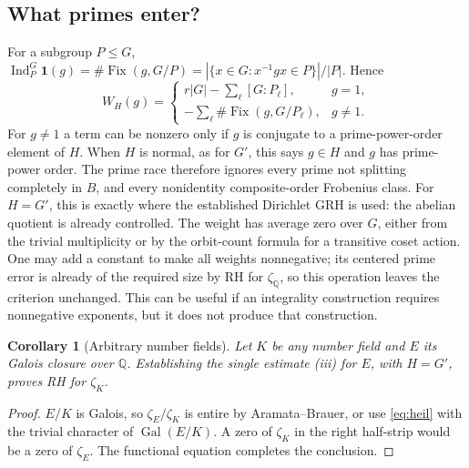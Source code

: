 \documentclass[11pt]{article}
\newtheorem{corollary}[theorem]{Corollary}
\theoremstyle{remark}\newtheorem{remark}[theorem]{Remark}
\newcommand{\Q}{\mathbb Q}
\newcommand{\Ind}{\operatorname{Ind}}
\newcommand{\Fix}{\operatorname{Fix}}
\newcommand{\one}{\mathbf{1}}
\begin{document}
\subsection{What primes enter?}
For a subgroup $P\le G$, $\Ind_P^G\one(g)=\#\Fix(g,G/P)=|\{x\in G:x^{-1}gx\in P\}|/|P|$. Hence
\begin{equation}\label{eq:weights}
 W_H(g)=\begin{cases}
 r|G|-\displaystyle\sum_\ell [G:P_\ell],&g=1,\\
 -\displaystyle\sum_\ell \#\Fix(g,G/P_\ell),&g\ne1.
 \end{cases}
\end{equation}
For $g\ne1$ a term can be nonzero only if $g$ is conjugate to a prime-power-order element of $H$. When $H$ is normal, as for $G'$, this says $g\in H$ and $g$ has prime-power order. The prime race therefore ignores every prime not splitting completely in $B$, and every nonidentity composite-order Frobenius class. For $H=G'$, this is exactly where the established Dirichlet GRH is used: the abelian quotient is already controlled. The weight has average zero over $G$, either from the trivial multiplicity or by the orbit-count formula for a transitive coset action. One may add a constant to make all weights nonnegative; its centered prime error is already of the required size by RH for $\zeta_{\Q}$, so this operation leaves the criterion unchanged. This can be useful if an integrality construction requires nonnegative exponents, but it does not produce that construction.

\begin{corollary}[Arbitrary number fields]\label{cor:any}
Let $K$ be any number field and $E$ its Galois closure over $\Q$. Establishing the single estimate (iii) for $E$, with $H=G'$, proves RH for $\zeta_K$.
\end{corollary}
\begin{proof}
$E/K$ is Galois, so $\zeta_E/\zeta_K$ is entire by Aramata--Brauer, or use \eqref{eq:heil} with the trivial character of $\operatorname{Gal}(E/K)$. A zero of $\zeta_K$ in the right half-strip would be a zero of $\zeta_E$. The functional equation completes the conclusion.
\end{proof}
\end{document}
